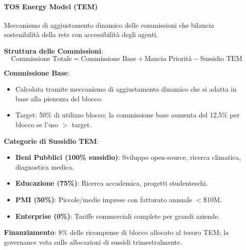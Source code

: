 \documentclass[11pt]{article}
\begin{document}
\paragraph{TOS Energy Model (TEM)}
Meccanismo di aggiustamento dinamico delle commissioni che bilancia sostenibilità della rete con accessibilità degli agenti.

\textbf{Struttura delle Commissioni}:
\begin{equation}
\text{Commissione Totale} = \text{Commissione Base} + \text{Mancia Priorità} - \text{Sussidio TEM}
\end{equation}

\textbf{Commissione Base}:
\begin{itemize}[noitemsep]
  \item Calcolata tramite meccanismo di aggiustamento dinamico che si adatta in base alla pienezza del blocco.
  \item Target: 50\% di utilizzo blocco; la commissione base aumenta del 12,5\% per blocco se l'uso $>$ target.
\end{itemize}

\textbf{Categorie di Sussidio TEM}:
\begin{itemize}[noitemsep]
  \item \textbf{Beni Pubblici (100\% sussidio)}: Sviluppo open-source, ricerca climatica, diagnostica medica.
  \item \textbf{Educazione (75\%)}: Ricerca accademica, progetti studenteschi.
  \item \textbf{PMI (50\%)}: Piccole/medie imprese con fatturato annuale $<$\$10M.
  \item \textbf{Enterprise (0\%)}: Tariffe commerciali complete per grandi aziende.
\end{itemize}

\textbf{Finanziamento}: 8\% delle ricompense di blocco allocato al tesoro TEM; la governance vota sulle allocazioni di sussidi trimestralmente.
\end{document}
